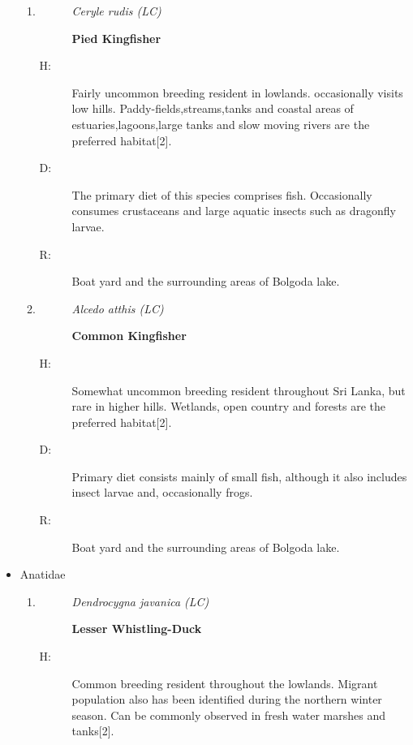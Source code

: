 \begin{itemize}
\begin{enumerate}
\item%
\begin{description}%
\item[]%
\textit{Ceryle rudis (LC)}%
\item[]%
\textbf{Pied Kingfisher}%
\end{description}%
\begin{description}%
\item[H: ]%
Fairly uncommon breeding resident in lowlands. occasionally visits low hills. Paddy-fields,streams,tanks and coastal areas of estuaries,lagoons,large tanks and slow moving rivers are the preferred habitat{[}2{]}.%
\item[D: ]%
The primary diet of this species comprises fish. Occasionally consumes crustaceans and large aquatic insects such as dragonfly larvae.%
\item[R: ]%
Boat yard and the surrounding areas of Bolgoda lake.%
\end{description}%
\item%
\begin{description}%
\item[]%
\textit{Alcedo atthis (LC)}%
\item[]%
\textbf{Common Kingfisher}%
\end{description}%
\begin{description}%
\item[H: ]%
Somewhat uncommon breeding resident throughout Sri Lanka, but rare in higher hills. Wetlands, open country and forests are the preferred habitat{[}2{]}.%
\item[D: ]%
Primary diet consists mainly of small fish, although it also includes insect larvae and, occasionally frogs.%
\item[R: ]%
Boat yard and the surrounding areas of Bolgoda lake.%
\end{description}%
\end{enumerate}%
\item%
Anatidae%
\begin{enumerate}%
\item%
\begin{description}%
\item[]%
\textit{Dendrocygna javanica (LC)}%
\item[]%
\textbf{Lesser Whistling{-}Duck}%
\end{description}%
\begin{description}%
\item[H: ]%
Common breeding resident throughout the lowlands. Migrant population also has been identified during the northern winter season. Can be commonly observed in fresh water marshes and tanks{[}2{]}.%

\end{description}
\end{enumerate}
\end{itemize}

